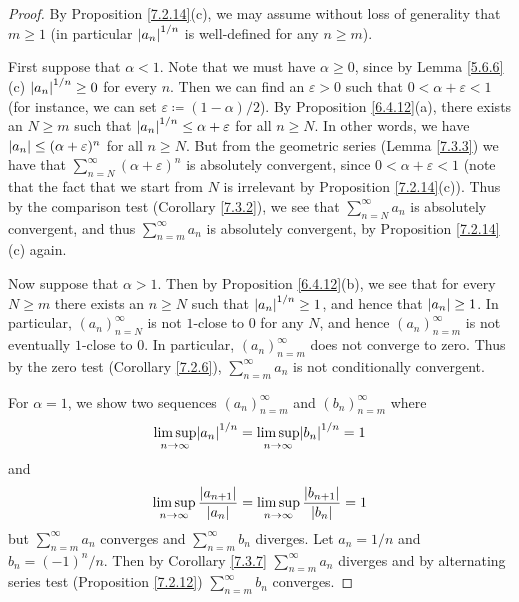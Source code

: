 \begin{proof}
    By Proposition \ref{7.2.14}(c), we may assume without loss of generality that \(m \geq 1\)
    (in particular \(\abs*{a_n}^{1 / n}\) is well-defined for any \(n \geq m\)).

    First suppose that \(\alpha < 1\).
    Note that we must have \(\alpha \geq 0\), since by Lemma \ref{5.6.6}(c) \(\abs*{a_n}^{1 / n} \geq 0\) for every \(n\).
    Then we can find an \(\varepsilon > 0\) such that \(0 < \alpha + \varepsilon < 1\) (for instance, we can set \(\varepsilon \coloneqq (1 - \alpha) / 2\)).
    By Proposition \ref{6.4.12}(a), there exists an \(N \geq m\) such that \(\abs*{a_n}^{1 / n} \leq \alpha + \varepsilon\) for all \(n \geq N\).
    In other words, we have \(\abs*{a_n} \leq (\alpha + \varepsilon)^n\) for all \(n \geq N\).
    But from the geometric series (Lemma \ref{7.3.3}) we have that \(\sum_{n = N}^\infty (\alpha + \varepsilon)^n\) is absolutely convergent, since \(0 < \alpha + \varepsilon < 1\)
    (note that the fact that we start from \(N\) is irrelevant by Proposition \ref{7.2.14}(c)).
    Thus by the comparison test (Corollary \ref{7.3.2}), we see that \(\sum_{n = N}^\infty a_n\) is absolutely convergent, and thus \(\sum_{n = m}^\infty a_n\) is absolutely convergent, by Proposition \ref{7.2.14}(c) again.

    Now suppose that \(\alpha > 1\).
    Then by Proposition \ref{6.4.12}(b), we see that for every \(N \geq m\) there exists an \(n \geq N\) such that \(\abs*{a_n}^{1 / n} \geq 1\), and hence that \(\abs*{a_n} \geq 1\).
    In particular, \((a_n)_{n = N}^\infty\) is not \(1\)-close to \(0\) for any \(N\), and hence \((a_n)_{n = m}^\infty\) is not eventually \(1\)-close to \(0\).
    In particular, \((a_n)_{n = m}^\infty\) does not converge to zero.
    Thus by the zero test (Corollary \ref{7.2.6}), \(\sum_{n = m}^\infty a_n\) is not conditionally convergent.

    For \(\alpha = 1\), we show two sequences \((a_n)_{n = m}^\infty\) and \((b_n)_{n = m}^\infty\) where
    \[
        \limsup_{n \to \infty} \abs*{a_n}^{1 / n} = \limsup_{n \to \infty} \abs*{b_n}^{1 / n} = 1
    \]
    and
    \[
        \limsup_{n \to \infty} \frac{\abs*{a_{n + 1}}}{\abs*{a_n}} = \limsup_{n \to \infty} \frac{\abs*{b_{n + 1}}}{\abs*{b_n}} = 1
    \]
    but \(\sum_{n = m}^\infty a_n\) converges and \(\sum_{n = m}^\infty b_n\) diverges.
    Let \(a_n = 1 / n\) and \(b_n = (-1)^n / n\).
    Then by Corollary \ref{7.3.7} \(\sum_{n = m}^\infty a_n\) diverges and by alternating series test (Proposition \ref{7.2.12}) \(\sum_{n = m}^\infty b_n\) converges.


\end{proof}
